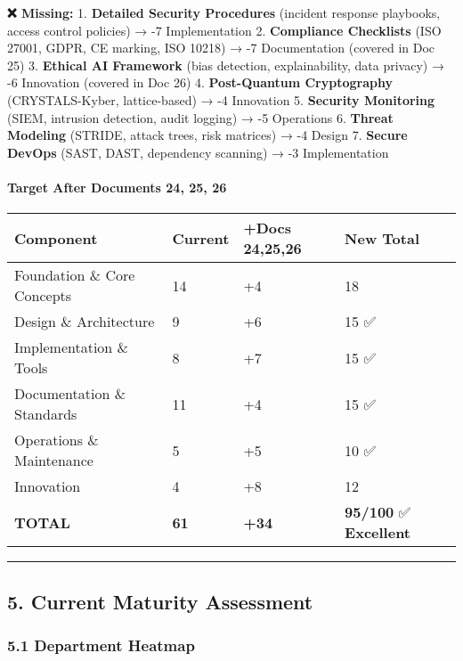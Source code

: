 \documentclass[
]{article}
\begin{document}
\textbf{❌ Missing:} 1. \textbf{Detailed Security Procedures} (incident
response playbooks, access control policies) → -7 Implementation 2.
\textbf{Compliance Checklists} (ISO 27001, GDPR, CE marking, ISO 10218)
→ -7 Documentation (covered in Doc 25) 3. \textbf{Ethical AI Framework}
(bias detection, explainability, data privacy) → -6 Innovation (covered
in Doc 26) 4. \textbf{Post-Quantum Cryptography} (CRYSTALS-Kyber,
lattice-based) → -4 Innovation 5. \textbf{Security Monitoring} (SIEM,
intrusion detection, audit logging) → -5 Operations 6. \textbf{Threat
Modeling} (STRIDE, attack trees, risk matrices) → -4 Design 7.
\textbf{Secure DevOps} (SAST, DAST, dependency scanning) → -3
Implementation

\hypertarget{target-after-documents-24-25-26}{%
\paragraph{Target After Documents 24, 25,
26}\label{target-after-documents-24-25-26}}

\begin{longtable}[]{@{}llll@{}}
\toprule\noalign{}
Component & Current & +Docs 24,25,26 & New Total \\
\midrule\noalign{}
\endhead
\bottomrule\noalign{}
\endlastfoot
Foundation \& Core Concepts & 14 & +4 & 18 \\
Design \& Architecture & 9 & +6 & 15 ✅ \\
Implementation \& Tools & 8 & +7 & 15 ✅ \\
Documentation \& Standards & 11 & +4 & 15 ✅ \\
Operations \& Maintenance & 5 & +5 & 10 ✅ \\
Innovation & 4 & +8 & 12 \\
\textbf{TOTAL} & \textbf{61} & \textbf{+34} & \textbf{95/100} ✅
\textbf{Excellent} \\
\end{longtable}

\begin{center}\rule{0.5\linewidth}{0.5pt}\end{center}

\hypertarget{current-maturity-assessment}{%
\subsection{5. Current Maturity
Assessment}\label{current-maturity-assessment}}

\hypertarget{department-heatmap}{%
\subsubsection{5.1 Department Heatmap}\label{department-heatmap}}
\end{document}
